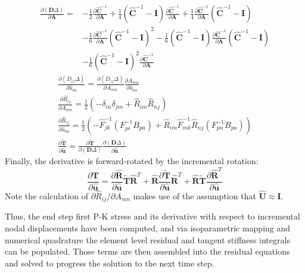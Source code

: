 \begin{equation}
\begin{aligned}
\frac{\partial ({\bm D}\Delta)}{\partial {\bm A}} = &-\frac{1}{2}\frac{\partial {\hat{\bm C}^{-1}}}{\partial \bm A} + \frac{1}{4}({\hat{\bm C}}^{-1} - {\bm I})\frac{\partial \hat{\bm C}^{-1}}{\partial {\bm A}} + \frac{1}{4}\frac{\partial \hat{\bm C}^{-1}}{\partial {\bm A}}({\hat{\bm C}}^{-1} - {\bm I}) \\
&-\frac{1}{6} \frac{\partial {\hat{\bm C}^{-1}}}{\partial \bm A} (\hat{\bm C}^{-1} - {\bm I})^{2} - \frac{1}{6}  (\hat{\bm C}^{-1} - {\bm I}) \frac{\partial {\hat{\bm C}^{-1}}}{\partial \bm A} (\hat{\bm C}^{-1} - {\bm I}) \\
&- \frac{1}{6}(\hat{\bm C}^{-1} - {\bm I})^{2} \frac{\partial {\hat{\bm C}^{-1}}}{\partial \bm A} 
\end{aligned}
\end{equation}
\begin{gather}
\frac{\partial (D_{ij}\Delta)}{\partial \hat{u}_{ka}} = \frac{\partial (D_{ij}\Delta)}{\partial A_{mn}}\frac{\partial A_{mn}}{\partial \hat{u}_{ka}} \\
\frac{\partial \hat{R}_{ij}}{\partial A_{mn}} = \frac{1}{2}(-\delta_{in}\delta_{jm} + \hat{R}_{im}\hat{R}_{nj}) \\
\frac{\partial \hat{R}_{ij}}{\partial \hat{u}_{ka}} = \frac{1}{2}\left(-\hat{F}_{jk}^{-1}(F_{pi}^{-1}B_{pa}) + \hat{R}_{im}\hat{F}_{mk}^{-1}\hat{R}_{nj}(F_{pn}^{-1}B_{pa})\right) \\
\frac{\partial \tilde{\bm T}}{\partial \hat{\bm u}} = \frac{\partial \tilde{\bm T}}{\partial ({\bm D}\Delta)}\frac{\partial ({\bm D}\Delta)}{\partial \hat{\bm u}}
\end{gather}
Finally, the derivative is forward-rotated by the incremental rotation:
\begin{equation}
\frac{\partial {\bm T}}{\partial \hat{\bm u}} = \frac{\partial \hat{\bm R}}{\partial \hat{\bm u}}{\tilde {\bm T}}{\hat{\bm R}}^{T} + {\hat{\bm R}}\frac{\partial \tilde{\bm T}}{\partial \hat{\bm u}}\hat{\bm R}^T + \hat{\bm R}\tilde{\bm T}\frac{\partial \hat{\bm R}^{T}}{\partial \hat{\bm u}}
\end{equation}
Note the calculation of ${\partial \hat{R}_{ij}}/{\partial A_{mn}}$ makes use of the assumption that $\hat{\bm{U}} \approx \bm{I}$.

Thus, the end step first P-K stress and its derivative with respect to incremental nodal displacements have been computed, and via isoparametric mapping and numerical quadrature the element level residual and tangent stiffness integrals can be populated. Those terms are then assembled into the residual equations and solved to progress the solution to the next time step.

